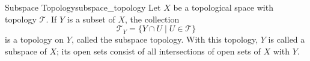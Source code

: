 
\begin{definition}{Subspace Topology}{subspace_topology}
Let $X$ be a topological space with topology $\mathcal{T}$. If $Y$ is a subset of $X$, the collection
$$
\mathcal{T}_{Y}=\{Y \cap U \mid U \in \mathcal{T}\}
$$
is a topology on $Y$, called the subspace topology. With this topology, $Y$ is called a subspace of $X$; its open sets consist of all intersections of open sets of $X$ with $Y$.
\end{definition}
